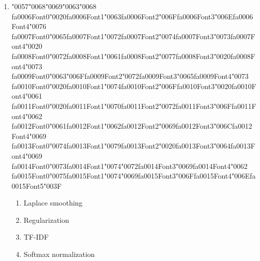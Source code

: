 \documentclass[12pt]{article}
\begin{document}
\begin{enumerate}[label=Q\arabic*.]
\item {\char"0057}{\char"0068}{\char"0069}{\char"0063}{\char"0068} {\csname fa0006Font0\endcsname\char"0020}{\csname fa0006Font1\endcsname\char"0063}{\csname fa0006Font2\endcsname\char"006F}{\csname fa0006Font3\endcsname\char"006E}{\csname fa0006Font4\endcsname\char"0076} {\csname fa0007Font0\endcsname\char"0065}{\csname fa0007Font1\endcsname\char"0072}{\csname fa0007Font2\endcsname\char"0074}{\csname fa0007Font3\endcsname\char"0073}{\csname fa0007Font4\endcsname\char"0020} {\csname fa0008Font0\endcsname\char"0072}{\csname fa0008Font1\endcsname\char"0061}{\csname fa0008Font2\endcsname\char"0077}{\csname fa0008Font3\endcsname\char"0020}{\csname fa0008Font4\endcsname\char"0073} {\csname fa0009Font0\endcsname\char"0063}{\char"006F}{\csname fa0009Font2\endcsname\char"0072}{\csname fa0009Font3\endcsname\char"0065}{\csname fa0009Font4\endcsname\char"0073} {\csname fa0010Font0\endcsname\char"0020}{\csname fa0010Font1\endcsname\char"0074}{\csname fa0010Font2\endcsname\char"006F}{\csname fa0010Font3\endcsname\char"0020}{\csname fa0010Font4\endcsname\char"0061} {\csname fa0011Font0\endcsname\char"0020}{\csname fa0011Font1\endcsname\char"0070}{\csname fa0011Font2\endcsname\char"0072}{\csname fa0011Font3\endcsname\char"006F}{\csname fa0011Font4\endcsname\char"0062} {\csname fa0012Font0\endcsname\char"0061}{\csname fa0012Font1\endcsname\char"0062}{\csname fa0012Font2\endcsname\char"0069}{\csname fa0012Font3\endcsname\char"006C}{\csname fa0012Font4\endcsname\char"0069} {\csname fa0013Font0\endcsname\char"0074}{\csname fa0013Font1\endcsname\char"0079}{\csname fa0013Font2\endcsname\char"0020}{\csname fa0013Font3\endcsname\char"0064}{\csname fa0013Font4\endcsname\char"0069} {\csname fa0014Font0\endcsname\char"0073}{\csname fa0014Font1\endcsname\char"0074}{\char"0072}{\csname fa0014Font3\endcsname\char"0069}{\csname fa0014Font4\endcsname\char"0062} {\csname fa0015Font0\endcsname\char"0075}{\csname fa0015Font1\endcsname\char"0074}{\char"0069}{\csname fa0015Font3\endcsname\char"006F}{\csname fa0015Font4\endcsname\char"006E}{\csname fa0015Font5\endcsname\char"003F}
\begin{enumerate}[label=(\Alph*)]
    \item Laplace smoothing
    \item Regularization
    \item TF-IDF
    \item Softmax normalization
\end{enumerate}

\end{enumerate}
\end{document}
